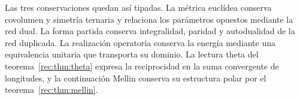 Las tres conservaciones quedan así tipadas. La métrica euclídea
conserva covolumen y simetría ternaria y relaciona los parámetros
opuestos mediante la red dual. La forma partida conserva integralidad,
paridad y autodualidad de la red duplicada. La realización operatoria
conserva la energía mediante una equivalencia unitaria que transporta
su dominio. La lectura theta del teorema~\ref{rec:thm:theta} expresa
la reciprocidad en la suma convergente de longitudes, y la continuación
Mellin conserva su estructura polar por el
teorema~\ref{rec:thm:mellin}.
